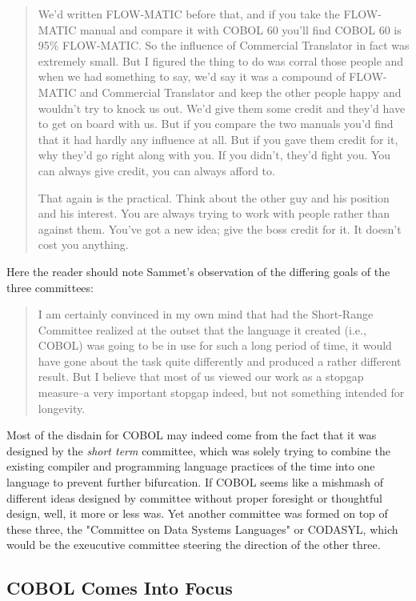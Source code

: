 \begin{quotation}
	We'd written FLOW-MATIC before that, and if you take the FLOW-MATIC
	manual and compare it with COBOL 60 you'll find COBOL 60 is 95\% FLOW-MATIC. So the
	influence of Commercial Translator in fact was extremely small. But I figured the thing to do was
	corral those people and when we had something to say, we'd say it was a compound of FLOW-MATIC
	and Commercial Translator and keep the other people happy and wouldn't try to knock
	us out. We'd give them some credit and they'd have to get on board with us. But if you compare
	the two manuals you'd find that it had hardly any influence at all. But if you gave them credit for
	it, why they'd go right along with you. If you didn't, they'd fight you. You can always give credit,
	you can always afford to.

	That again is the practical. Think about the other guy and his position and his interest. You are
	always trying to work with people rather than against them. You've got a new idea; give the
	boss credit for it. It doesn't cost you anything.
\end{quotation}

Here the reader should note Sammet's observation of the differing goals of the three committees:

\begin{quotation}
	I am certainly convinced in my own mind that had the Short-Range Committee
	realized at the outset that the language it created (i.e., COBOL) was going to
	be in use for such a long period of time, it would have gone about the task
	quite differently and produced a rather different result. But I believe that
	most of us viewed our work as a stopgap measure--a very important stopgap
	indeed, but not something intended for longevity.
\end{quotation}

Most of the disdain for COBOL may indeed come from the fact that it was designed by the \textit{short term}
committee, which was solely trying to combine the existing compiler and programming language practices
of the time into one language to prevent further bifurcation.
If COBOL seems like a mishmash of different ideas designed by committee without proper
foresight or thoughtful design, well, it more or less was.
Yet another committee was formed on top of these three, the "Committee on Data Systems Languages"
or CODASYL, which would be the exeucutive committee steering the direction of the other three.

\subsection{COBOL Comes Into Focus}
\label{subsec:cobol-comes-into-focus}

